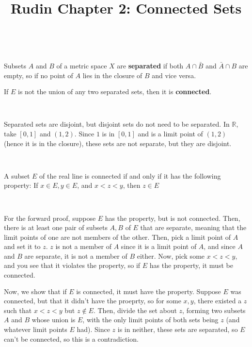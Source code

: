 \documentclass{article}
\title{Rudin Chapter 2: Connected Sets}
\begin{document}
\maketitle

\begin{definition}
\

Subsets $A$ and $B$ of a metric space $X$ are \textbf{separated} if both $A \cap \bar{B}$ and $\bar{A} \cap B$ are empty, so if no point of $A$ lies in the closure of $B$ and vice versa.

If $E$ is not the union of any two separated sets, then it is \textbf{connected}. 
\end{definition}

\begin{example}
\

Separated sets are disjoint, but disjoint sets do not need to be separated. In $\mathbb{R}$, take $[0,1]$ and $(1,2)$. Since $1$ is in $[0,1]$ and is a limit point of $(1,2)$ (hence it is in the closure), these sets are not separate, but they are disjoint.
\end{example}

\begin{theorem}
\

A subset $E$ of the real line is connected if and only if it has the following property: If $x \in E, y \in E$, and $x < z < y$, then $z \in E$
\end{theorem}

\begin{customproof}
\

For the forward proof, suppose $E$ has the property, but is not connected. Then, there is at least one pair of subsets $A,B$ of $E$ that are separate, meaning that the limit points of one are not members of the other. Then, pick a limit point of $A$ and set it to $z$. $z$ is not a member of $A$ since it is a limit point of $A$, and since $A$ and $B$ are separate, it is not a member of $B$ either. Now, pick some $x < z < y$, and you see that it violates the property, so if $E$ has the property, it must be connected.

Now, we show that if $E$ is connected, it must have the property. Suppose $E$ was connected, but that it didn't have the proeprty, so for some $x,y$, there existed a $z$ such that $x < z < y$ but $z \notin E$. Then, divide the set about $z$, forming two subsets $A$ and $B$ whose union is $E$, with the only limit points of both sets being $z$ (and whatever limit points $E$ had). Since $z$ is in neither, these sets are separated, so $E$ can't be connected, so this is a contradiction.
\end{customproof}
\end{document}
